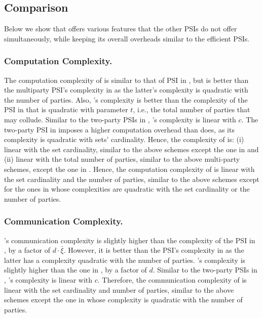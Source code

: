 \vs
\vs

\subsection{Comparison}

\svs

Below we show that \epsi offers various features that the other PSIs do not offer simultaneously, while keeping its overall overheads similar to the efficient PSIs.  

\vs
\vs

\subsubsection{Computation Complexity.} The  computation complexity  of \epsi is similar to that of PSI in \cite{AbadiDMT22}, but is better than the multiparty PSI's complexity in \cite{DBLP:conf/ccs/KolesnikovMPRT17} as  the latter's complexity is quadratic with the number of parties. Also, \epsi's complexity  is better than the complexity of the PSI in  \cite{NevoTY21}  that is quadratic with parameter $t$, i.e., the total number of parties that may collude. Similar to the two-party PSIs in \cite{DebnathD16,RaghuramanR22}, \epsi's complexity is linear with $c$.  The two-party PSI in \cite{DBLP:conf/dbsec/DongCCR13} imposes a higher computation overhead than \epsi does, as its complexity is quadratic with sets' cardinality. Hence, the complexity of \epsi is: (i) linear with the set cardinality, similar to the above schemes except the one in \cite{DBLP:conf/dbsec/DongCCR13} and (ii) linear with the total number of parties, similar to  the above multi-party schemes, except the one in \cite{DBLP:conf/ccs/KolesnikovMPRT17}. 
%
Hence, the computation complexity of \epsi is linear with the set cardinality and the number of parties, similar to the above schemes except for the ones in \cite{DBLP:conf/ccs/KolesnikovMPRT17,DBLP:conf/dbsec/DongCCR13} whose complexities are quadratic with the set cardinality or the number of parties. 

\vs
\vs


\subsubsection{Communication Complexity.}  \epsi's communication complexity is slightly higher than the complexity of the PSI in \cite{AbadiDMT22}, by a factor of $d\cdot \bar\xi$. However, it is better than the  PSI's complexity in \cite{DBLP:conf/ccs/KolesnikovMPRT17} as the latter has a complexity quadratic with the number of parties. \epsi's complexity is slightly higher than the one in \cite{NevoTY21}, by a factor of $d$. Similar to the two-party PSIs in  \cite{DebnathD16,RaghuramanR22,DBLP:conf/dbsec/DongCCR13}, \epsi's complexity is linear with $c$. 
%
Therefore, the communication complexity of \epsi is linear with the set cardinality and number of parties, similar to the above schemes except the one in \cite{DBLP:conf/ccs/KolesnikovMPRT17} whose complexity is quadratic with the number of parties. 

